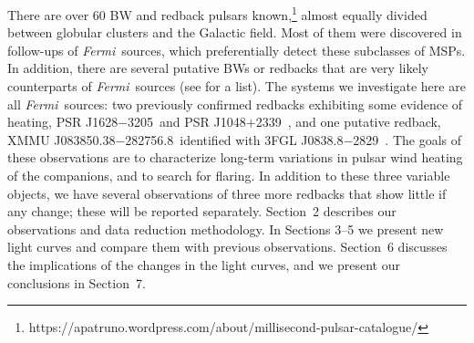\documentclass[iop]{emulateapj}
\newcommand{\fermi}{{\it Fermi}}
\newcommand{\mspone}{PSR J1628$-$3205}
\newcommand{\msptwo}{PSR J1048$+$2339}
\newcommand{\mspthree}{XMMU J083850.38$-$282756.8}
\newcommand{\fgl}{3FGL J0838.8$-$2829}
\begin{document}
There are over 60 BW and redback pulsars known,\footnote{https://apatruno.wordpress.com/about/millisecond-pulsar-catalogue/}
almost equally divided between globular clusters and the Galactic field.
Most of them were discovered in follow-ups of
\fermi\ sources, which preferentially detect these subclasses of MSPs.
In addition, there are several putative BWs or redbacks that are very
likely counterparts of \fermi\ sources (see \citealt{li18} for a list). 
The systems we investigate here are all \fermi\ sources: two previously
confirmed redbacks exhibiting some evidence of heating,
\mspone\ and \msptwo\ \citep{li14,den16}, and one
putative redback, \mspthree\ identified with \fgl\ \citep{hal17b}.
The goals of these observations are to characterize long-term variations in
pulsar wind heating of the companions, and to search for flaring.
In addition to these three variable objects, we have several observations
of three more redbacks that show little if any change; these will be reported
separately. Section~2 describes our observations and data reduction
methodology.  In Sections 3--5 we present new light
curves and compare them with previous observations. Section~6 discusses the
implications of the changes in the light curves, and we present our conclusions
in Section~7.
\end{document}
